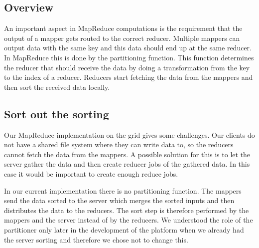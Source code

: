 \subsection{Overview}

An important aspect in MapReduce computations is the requirement that the output of a mapper
gets routed to the correct reducer.
Multiple mappers can output data with the same key and this data should end up
at the same reducer.
In MapReduce this is done by the partitioning function. This function determines
the reducer that should receive the data by doing a transformation from the key
to the index of a reducer. Reducers start fetching the data from the mappers and
then sort the received data locally.

\subsection{Sort out the sorting}

Our MapReduce implementation on the grid gives some challenges.
Our clients do not have a shared file system where they can write data to, so
the reducers cannot fetch the data from the mappers.
A possible solution for this is to let the server gather the data and then
create reducer jobs of the gathered data.
In this case it would be important to create enough reduce jobs.

In our current implementation there is no partitioning function. The mappers
send the data sorted to the server which merges the sorted inputs
and then distributes the data to the reducers. The sort step is therefore
performed by the mappers and the server instead of by the reducers.
We understood the role of the partitioner only later in the development of the platform
when we already had the server sorting and therefore we chose not to change this.